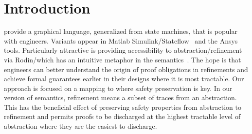 

\section{Introduction}
\label{sec:intro}





\SCs provide a graphical language, generalized from state machines, that is popular with engineers.
Variants appear in Matlab Simulink/Stateflow~\cite{MATLAB:2019} and the Ansys tools.  
Particularly attractive is providing accessibility to abstraction/refinement via Rodin/\EventB which has an intuitive metaphor in the \SC semantics~\cite{MoSnHo18,MoSnHo-ABZ2020}.  
The hope is that engineers can better understand the origin of proof obligations in refinements and achieve formal guarantees earlier in their designs where it is most tractable.
Our approach is focused on a mapping to \EventB where safety preservation is key.  
In our version of \SC semantics, refinement means a subset of traces from an abstraction. 
This has the beneficial effect of preserving safety properties from abstraction to refinement and permits proofs to be discharged at the highest tractable level of abstraction where they are the easiest to discharge.

